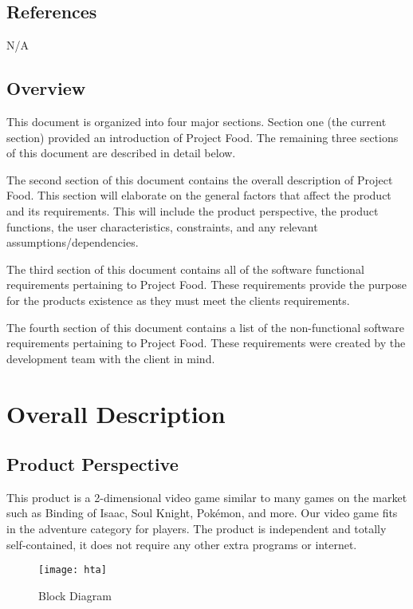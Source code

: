 \documentclass[12pt, titlepage]{article}
\begin{document}
  \subsection{References}
  N/A
  \subsection{Overview}

  This document is organized into four major sections. Section one (the current section) provided an introduction of Project Food. The remaining three sections of this document are described in detail below.

  The second section of this document contains the overall description of Project Food. This section will elaborate on the general factors that affect the product and its requirements. This will include the product perspective, the product functions, the user characteristics, constraints, and any relevant assumptions/dependencies.

  The third section of this document contains all of the software functional requirements pertaining to Project Food. These requirements provide the purpose for the products existence as they must meet the clients requirements.

  The fourth section of this document contains a list of the non-functional software requirements pertaining to Project Food. These requirements were created by the development team with the client in mind.


\section{Overall Description}

  \subsection{Product Perspective}
  This product is a 2-dimensional video game similar to many games on the market such as Binding of Isaac, Soul Knight, Pokémon, and more. Our video game fits in the adventure category for players. The product is independent and totally self-contained, it does not require any other extra programs or internet.
  
   \begin{figure}[htp]
        \centering
        \texttt{[image: hta]}
        \caption{Block Diagram}
        \label{fig:block}
   \end{figure}
\end{document}
